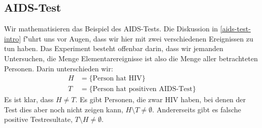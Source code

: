 \subsection{AIDS-Test}
Wir mathematisieren das Beispiel des AIDS-Tests.
Die Diskussion in \ref{aids-test-intro} f"uhrt uns vor Augen,
dass wir hier mit zwei verschiedenen Ereignissen zu tun haben. 
Das Experiment besteht offenbar darin, dass wir jemanden Untersuchen,
die Menge Elementarereignisse ist also die Menge aller betrachteten Personen.
Darin unterschieden wir:
\begin{align*}
H&=\{\text{Person hat HIV}\}\\
T&=\{\text{Person hat positiven AIDS-Test}\}
\end{align*}
Es ist klar, dass $H\ne T$. Es gibt Personen, die zwar HIV haben, bei
denen der Test dies aber noch nicht zeigen kann, $H\setminus T\ne \emptyset$.
Andererseits gibt es falsche positive Testresultate,
$T\setminus H\ne\emptyset$. 

%

